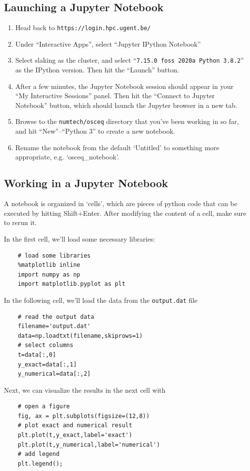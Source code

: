 \documentclass[a4paper]{article}
\begin{document}
\subsection{Launching a Jupyter Notebook}
%
\begin{enumerate}
	\item Head back to \texttt{https://login.hpc.ugent.be/}
	\item Under ``Interactive Apps'', select ``Jupyter IPython Notebook''
	\item Select slaking as the cluster, and select ``\texttt{7.15.0 foss 2020a Python 3.8.2}'' as the IPython version. Then hit the ``Launch'' button.
	\item After a few minutes, the Jupyter Notebook session should appear in your ``My Interactive Sessions'' panel. Then hit the ``Connect to Jupyter Notebook'' button, which should launch the Jupyter browser in a new tab.
	\item Browse to the \texttt{numtech/osceq} directory that you've been working in so far, and hit ``New''--``Python 3'' to create a new notebook.
	\item Rename the notebook from the default `Untitled' to something more appropriate, e.g. `osceq\_notebook'.
\end{enumerate}
%
\subsection{Working in a Jupyter Notebook}
%
\par
A notebook is organized in `cells', which are pieces of python code that can be executed by hitting Shift+Enter. After modifying the content of a cell, make sure to rerun it.
%
\par
In the first cell, we'll load some necessary libraries:
%
\begin{verbatim}
	# load some libraries
    %matplotlib inline
    import numpy as np
    import matplotlib.pyplot as plt
\end{verbatim}
%
\par
In the following cell, we'll load the data from the \texttt{output.dat} file
%
\begin{verbatim}
    # read the output data
    filename='output.dat'
    data=np.loadtxt(filename,skiprows=1)
	# select columns
    t=data[:,0]
    y_exact=data[:,1]
    y_numerical=data[:,2]
\end{verbatim}
%
\par
Next, we can visualize the results in the next cell with
%
\begin{verbatim}
    # open a figure
    fig, ax = plt.subplots(figsize=(12,8))
	# plot exact and numerical result
    plt.plot(t,y_exact,label='exact')
    plt.plot(t,y_numerical,label='numerical')
	# add legend
    plt.legend();
\end{verbatim}
%
\end{document}
